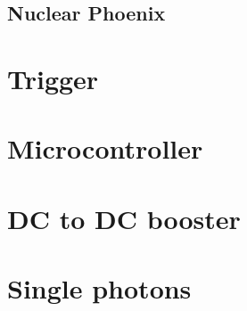 \subsection{Nuclear Phoenix}\label{sec:nuclear_phoenix}

\cite{Nucelar_phoenix}

\section{Trigger}

\section{Microcontroller}

\section{DC to DC booster}

\section{Single photons}